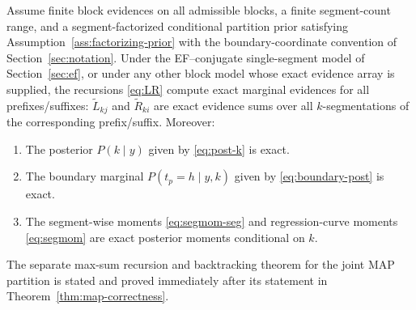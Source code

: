 \begin{theorem}
\label{thm:dp-correctness}
Assume finite block evidences on all admissible blocks, a finite segment-count range, and a
segment-factorized conditional partition prior satisfying Assumption~\ref{ass:factorizing-prior}
with the boundary-coordinate convention of Section~\ref{sec:notation}. Under the EF--conjugate
single-segment model of Section~\ref{sec:ef}, or under any other block model whose exact evidence
array is supplied, the recursions \eqref{eq:LR} compute exact marginal evidences for all
prefixes/suffixes:
$\widetilde{L}_{k j}$ and $\widetilde{R}_{k i}$ are exact evidence sums over all
$k$-segmentations of the corresponding prefix/suffix. Moreover:
\begin{enumerate}
\item The posterior $P(k\mid y)$ given by \eqref{eq:post-k} is exact.
\item The boundary marginal $P(t_p=h\mid y,k)$ given by \eqref{eq:boundary-post} is exact.
\item The segment-wise moments \eqref{eq:segmom-seg} and regression-curve moments \eqref{eq:segmom}
are exact posterior moments conditional on $k$.
\end{enumerate}
The separate max-sum recursion and backtracking theorem for the joint MAP partition is stated and
proved immediately after its statement in Theorem~\ref{thm:map-correctness}.
\end{theorem}

